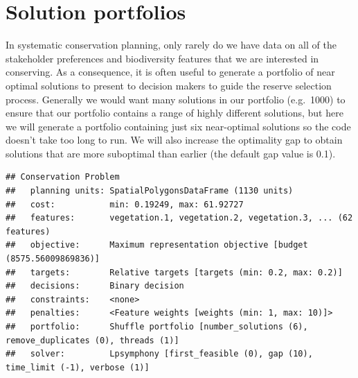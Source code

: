 \documentclass[12pt,]{book}
\newenvironment{Shaded}{\begin{snugshade}}{\end{snugshade}}
\newcommand{\KeywordTok}[1]{\textcolor[rgb]{0.13,0.29,0.53}{\textbf{#1}}}
\newcommand{\DataTypeTok}[1]{\textcolor[rgb]{0.13,0.29,0.53}{#1}}
\newcommand{\DecValTok}[1]{\textcolor[rgb]{0.00,0.00,0.81}{#1}}
\newcommand{\FloatTok}[1]{\textcolor[rgb]{0.00,0.00,0.81}{#1}}
\newcommand{\StringTok}[1]{\textcolor[rgb]{0.31,0.60,0.02}{#1}}
\newcommand{\CommentTok}[1]{\textcolor[rgb]{0.56,0.35,0.01}{\textit{#1}}}
\newcommand{\OtherTok}[1]{\textcolor[rgb]{0.56,0.35,0.01}{#1}}
\newcommand{\OperatorTok}[1]{\textcolor[rgb]{0.81,0.36,0.00}{\textbf{#1}}}
\newcommand{\NormalTok}[1]{#1}
\begin{document}
\section{Solution portfolios}\label{solution-portfolios}

In systematic conservation planning, only rarely do we have data on all
of the stakeholder preferences and biodiversity features that we are
interested in conserving. As a consequence, it is often useful to
generate a portfolio of near optimal solutions to present to decision
makers to guide the reserve selection process. Generally we would want
many solutions in our portfolio (e.g.~1000) to ensure that our portfolio
contains a range of highly different solutions, but here we will
generate a portfolio containing just six near-optimal solutions so the
code doesn't take too long to run. We will also increase the optimality
gap to obtain solutions that are more suboptimal than earlier (the
default gap value is 0.1).

\begin{Shaded}
\end{Shaded}

\begin{verbatim}
## Conservation Problem
##   planning units: SpatialPolygonsDataFrame (1130 units)
##   cost:           min: 0.19249, max: 61.92727
##   features:       vegetation.1, vegetation.2, vegetation.3, ... (62 features)
##   objective:      Maximum representation objective [budget (8575.56009869836)]
##   targets:        Relative targets [targets (min: 0.2, max: 0.2)]
##   decisions:      Binary decision 
##   constraints:    <none>
##   penalties:      <Feature weights [weights (min: 1, max: 10)]>
##   portfolio:      Shuffle portfolio [number_solutions (6), remove_duplicates (0), threads (1)]
##   solver:         Lpsymphony [first_feasible (0), gap (10), time_limit (-1), verbose (1)]
\end{verbatim}
\end{document}

